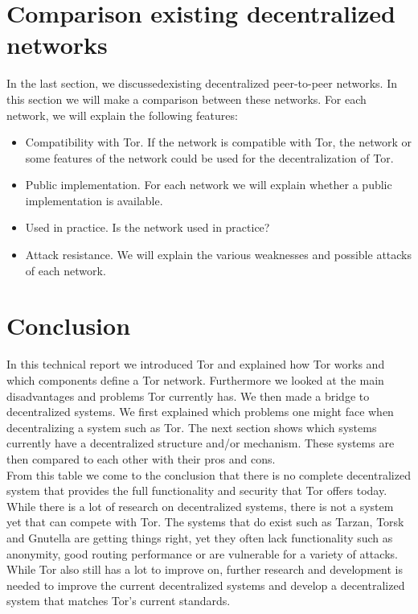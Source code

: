 \documentclass[journal]{IEEEtran}
\begin{document}
	\section{Comparison existing decentralized networks}
		
		In the last section, we discussedexisting decentralized peer-to-peer networks. In this section we will make a comparison between these networks. For each network, we will explain the following features:
\begin{itemize}
\item Compatibility with Tor. If the network is compatible with Tor, the network or some features of the network could be used for the decentralization of Tor.
\item Public implementation. For each network we will explain whether a public implementation is available.
\item Used in practice. Is the network used in practice?
\item Attack resistance. We will explain the various weaknesses and possible attacks of each network.
\end{itemize}
	
	\section{Conclusion}
		In this technical report we introduced Tor and explained how Tor works and which components define a Tor network. Furthermore we looked at the main disadvantages and problems Tor currently has. We then made a bridge to decentralized systems. We first explained which problems one might face when decentralizing a system such as Tor. The next section shows which systems currently have a decentralized structure and/or mechanism. These systems are then compared to each other with their pros and cons.\\
		
		From this table we come to the conclusion that there is no complete decentralized system that provides the full functionality and security that Tor offers today. While there is a lot of research on decentralized systems, there is not a system yet that can compete with Tor. The systems that do exist such as Tarzan, Torsk and Gnutella are getting things right, yet they often lack functionality such as anonymity, good routing performance or are vulnerable for a variety of  attacks.\\
		
While Tor also still has a lot to improve on, further research and development is needed to improve the current decentralized systems and develop a decentralized system that matches Tor's current standards.

	\appendices
	
	
\end{document}
